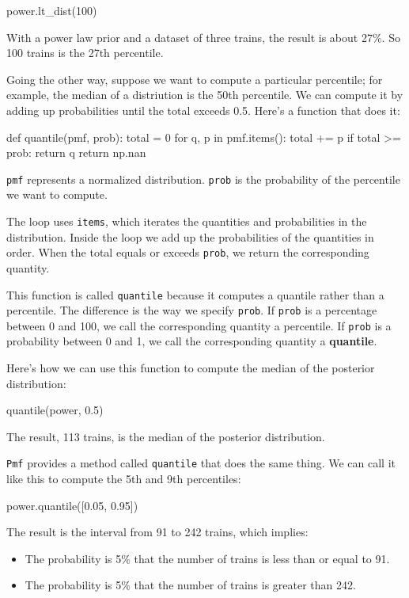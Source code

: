 \documentclass[12pt]{book}
\theoremstyle{exercise}
\newcommand{\py}[1]{{\tt #1}}%
\begin{document}
\begin{code}
power.lt_dist(100)
\end{code}

With a power law prior and a dataset of three trains, the result is about 27\%.
So 100 trains is the 27th percentile.

Going the other way, suppose we want to compute a particular percentile; for example, the median of a distriution is the 50th percentile.
We can compute it by adding up probabilities until the total exceeds 0.5.
Here's a function that does it:

\begin{code}
def quantile(pmf, prob):
    total = 0
    for q, p in pmf.items():
        total += p
        if total >= prob:
            return q
    return np.nan
\end{code}

\py{pmf} represents a normalized distribution.
\py{prob} is the probability of the percentile we want to compute.

The loop uses \py{items}, which iterates the quantities and probabilities in the distribution.
Inside the loop we add up the probabilities of the quantities in order.
When the total equals or exceeds \py{prob}, we return the corresponding quantity.

This function is called \py{quantile} because it computes a quantile rather than a percentile.
The difference is the way we specify \py{prob}.
If \py{prob} is a percentage between 0 and 100, we call the corresponding quantity a percentile.
If \py{prob} is a probability between 0 and 1, we call the corresponding quantity a {\bf quantile}.

Here's how we can use this function to compute the median of the posterior distribution:

\begin{code}
quantile(power, 0.5)
\end{code}

The result, 113 trains, is the median of the posterior distribution.

\py{Pmf} provides a method called \py{quantile} that does the same thing.
We can call it like this to compute the 5th and 9th percentiles:

\begin{code}
power.quantile([0.05, 0.95])
\end{code}

The result is the interval from 91 to 242 trains, which implies:

\begin{itemize}

\item The probability is 5\% that the number of trains is less than or equal to 91.

\item The probability is 5\% that the number of trains is greater than 242.

\end{itemize}
\end{document}
